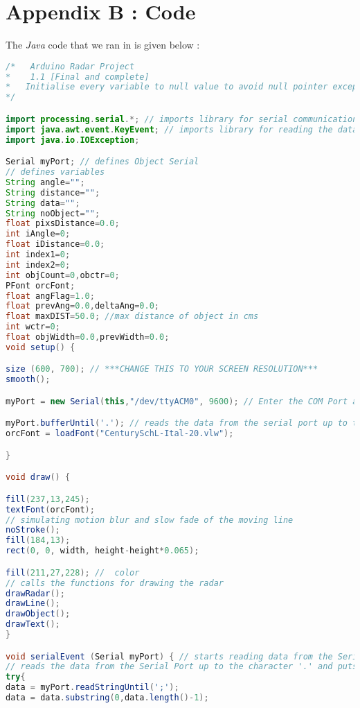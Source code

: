 \chapter{Appendix B : \processing{} Code}\label{ch:appAlabel}
The \emph{Java} code that we ran in \processing{} is given below :
\begin{mdframed}[backgroundcolor=light-gray, roundcorner=10pt,leftmargin=1, rightmargin=1, innerleftmargin=15, innertopmargin=15,innerbottommargin=15, outerlinewidth=1, linecolor=light-gray]
\begin{lstlisting}[caption={The Processing Code}, language=Java]
/*   Arduino Radar Project
*    1.1 [Final and complete]
*   Initialise every variable to null value to avoid null pointer exception
*/

import processing.serial.*; // imports library for serial communication
import java.awt.event.KeyEvent; // imports library for reading the data from the serial port
import java.io.IOException;

Serial myPort; // defines Object Serial
// defines variables
String angle="";
String distance="";
String data="";
String noObject="";
float pixsDistance=0.0;
int iAngle=0;
float iDistance=0.0;
int index1=0;
int index2=0;
int objCount=0,obctr=0;
PFont orcFont;
float angFlag=1.0;
float prevAng=0.0,deltaAng=0.0;
float maxDIST=50.0; //max distance of object in cms
int wctr=0;
float objWidth=0.0,prevWidth=0.0;
void setup() {

size (600, 700); // ***CHANGE THIS TO YOUR SCREEN RESOLUTION***
smooth();

myPort = new Serial(this,"/dev/ttyACM0", 9600); // Enter the COM Port address as COM4 or COM 22.starts the serial communication

myPort.bufferUntil('.'); // reads the data from the serial port up to the character '.'. So actually it reads this: angle,distance.
orcFont = loadFont("CenturySchL-Ital-20.vlw");

}

void draw() {

fill(237,13,245);
textFont(orcFont);
// simulating motion blur and slow fade of the moving line
noStroke();
fill(184,13); 
rect(0, 0, width, height-height*0.065); 

fill(211,27,228); //  color
// calls the functions for drawing the radar
drawRadar(); 
drawLine();
drawObject();
drawText();
}

void serialEvent (Serial myPort) { // starts reading data from the Serial Port
// reads the data from the Serial Port up to the character '.' and puts it into the String variable "data".
try{
data = myPort.readStringUntil(';');
data = data.substring(0,data.length()-1);


\end{lstlisting}
\end{mdframed}
